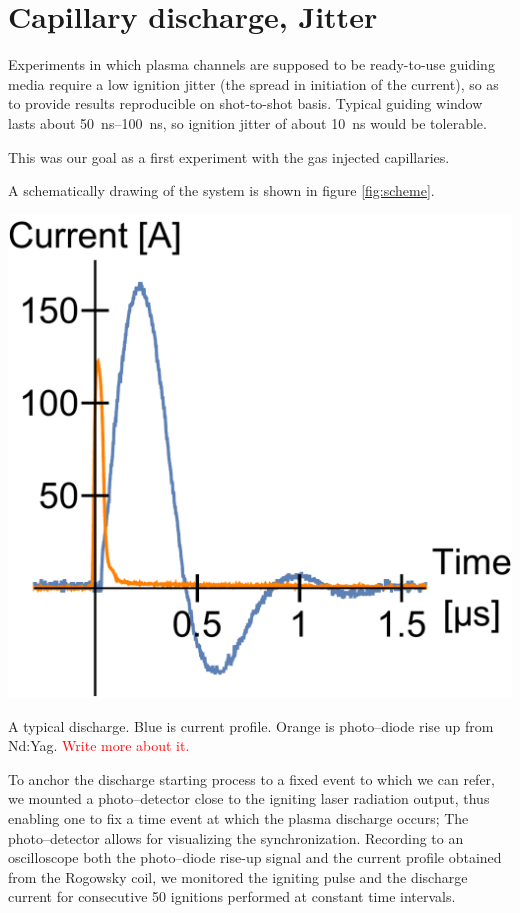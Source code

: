 \documentclass[../main.tex]{subfiles}
\begin{document}
\section{Capillary discharge, Jitter}\label{sec:jitter}
Experiments in which plasma channels are supposed to be ready-to-use guiding media require a low ignition jitter (the spread in initiation of the current), so as to provide results reproducible on shot-to-shot basis. Typical guiding window lasts about \SIrange{50}{100}{\ns}, so ignition jitter of about \SI{10}{ns} would be tolerable.

This was our goal as a first experiment with the gas injected capillaries.

A schematically drawing of the system is shown in figure \ref{fig:scheme}.
\begin{marginfigure}
    \includegraphics[width=\marginparwidth]{figures/jitter/discharge_sample.pdf}
    \caption{A typical discharge. Blue is current profile. Orange is photo--diode rise up from Nd:Yag. \textcolor{red}{Write more about it.}}
    \label{fig:discharge_sample}
\end{marginfigure}
To anchor the discharge starting process to a fixed event to which we can refer, we mounted a photo--detector close to the igniting laser radiation output, thus enabling one to fix a time event at which the plasma discharge occurs; The photo--detector allows for visualizing the synchronization. Recording to an oscilloscope both the photo--diode rise-up signal and the current profile obtained from the Rogowsky coil, we monitored the igniting pulse and the discharge current for consecutive 50 ignitions performed at constant time intervals.
\end{document}

